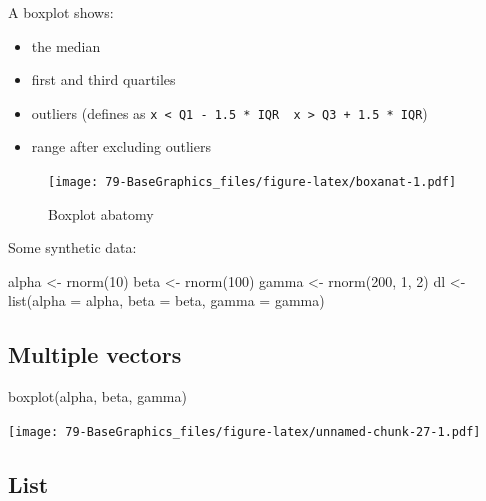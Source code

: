 \documentclass[
]{book}
\newenvironment{Shaded}{\begin{snugshade}}{\end{snugshade}}
\newcommand{\AttributeTok}[1]{\textcolor[rgb]{0.77,0.63,0.00}{#1}}
\newcommand{\DecValTok}[1]{\textcolor[rgb]{0.00,0.00,0.81}{#1}}
\newcommand{\FunctionTok}[1]{\textcolor[rgb]{0.00,0.00,0.00}{#1}}
\newcommand{\NormalTok}[1]{#1}
\newcommand{\OtherTok}[1]{\textcolor[rgb]{0.56,0.35,0.01}{#1}}
\providecommand{\tightlist}{%
  \setlength{\itemsep}{0pt}\setlength{\parskip}{0pt}}
\begin{document}
A boxplot shows:

\begin{itemize}
\tightlist
\item
  the median
\item
  first and third quartiles
\item
  outliers (defines as \texttt{x\ \textless{}\ Q1\ -\ 1.5\ *\ IQR\ \textbar{}\ x\ \textgreater{}\ Q3\ +\ 1.5\ *\ IQR})
\item
  range after excluding outliers
\end{itemize}

\begin{figure}
\centering
\texttt{[image: 79-BaseGraphics\_files/figure-latex/boxanat-1.pdf]}
\caption{\label{fig:boxanat}Boxplot abatomy}
\end{figure}

Some synthetic data:

\begin{Shaded}
\begin{Highlighting}[]
\NormalTok{alpha }\OtherTok{\textless{}{-}} \FunctionTok{rnorm}\NormalTok{(}\DecValTok{10}\NormalTok{)}
\NormalTok{beta }\OtherTok{\textless{}{-}} \FunctionTok{rnorm}\NormalTok{(}\DecValTok{100}\NormalTok{)}
\NormalTok{gamma }\OtherTok{\textless{}{-}} \FunctionTok{rnorm}\NormalTok{(}\DecValTok{200}\NormalTok{, }\DecValTok{1}\NormalTok{, }\DecValTok{2}\NormalTok{)}
\NormalTok{dl }\OtherTok{\textless{}{-}} \FunctionTok{list}\NormalTok{(}\AttributeTok{alpha =}\NormalTok{ alpha, }\AttributeTok{beta =}\NormalTok{ beta, }\AttributeTok{gamma =}\NormalTok{ gamma)}
\end{Highlighting}
\end{Shaded}

\hypertarget{multiple-vectors}{%
\subsection{Multiple vectors}\label{multiple-vectors}}

\begin{Shaded}
\begin{Highlighting}[]
\FunctionTok{boxplot}\NormalTok{(alpha, beta, gamma)}
\end{Highlighting}
\end{Shaded}

\texttt{[image: 79-BaseGraphics\_files/figure-latex/unnamed-chunk-27-1.pdf]}

\hypertarget{list}{%
\subsection{List}\label{list}}
\end{document}
